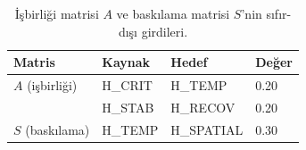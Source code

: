 \begin{table}[t]
\centering
\caption{İşbirliği matrisi $A$ ve baskılama matrisi $S$'nin sıfır-dışı girdileri.}
\label{tab:as-matrices}
\small
\begin{tabular}{@{}llll@{}}
\toprule
\textbf{Matris} & \textbf{Kaynak} & \textbf{Hedef} & \textbf{Değer} \\
\midrule
$A$ (işbirliği) & H\_CRIT    & H\_TEMP   & 0.20 \\
                & H\_STAB    & H\_RECOV  & 0.20 \\
\midrule
$S$ (baskılama) & H\_TEMP    & H\_SPATIAL & 0.30 \\
\bottomrule
\end{tabular}
\end{table}
